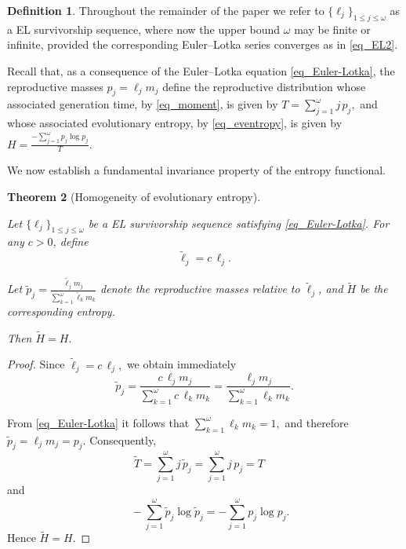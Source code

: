 \documentclass[10pt,a4paper]{amsart}
\newtheorem{thm}{Theorem}[section]
\theoremstyle{definition}
\newtheorem{defn}[thm]{Definition}
\theoremstyle{remark}
\numberwithin{equation}{section}
\begin{document}
\begin{defn}
Throughout the remainder of the paper we refer to
$
\{\ell_j\}_{1\le j\le \omega}
$
as a EL survivorship sequence, where now
the upper bound \(\omega\) may be finite or infinite, provided the
corresponding Euler--Lotka series converges as in \eqref{eq_EL2}.
\end{defn}


Recall that, as a consequence of the Euler--Lotka  equation \eqref{eq_Euler-Lotka}, the reproductive masses
$
p_j
=
\ell_jm_j
$
define the reproductive distribution whose associated
generation time, by \eqref{eq_moment}, is given by
$
T
=
\sum_{j=1}^{\omega}
j\,p_j,
$
and whose associated evolutionary entropy, by \eqref{eq_eventropy}, is given by
$H
=
\frac{
-\sum_{j=1}^{\omega}
p_j\log p_j
}
{
T
}.$

We now establish a fundamental invariance property of the entropy
functional.

\begin{thm}[Homogeneity of evolutionary entropy]
\label{thm_scale_invariance}

Let
$
\{\ell_j\}_{1\le j\le \omega}
$
be a EL survivorship sequence satisfying
\eqref{eq_Euler-Lotka}.
For any  \(c>0\), define
\[
\widetilde{\ell}_j
=
c\,\ell_j.
\]

Let 
$
\widetilde p_j
=
\frac{
	\widetilde{\ell}_j m_j
}{
	\sum_{k=1}^{\omega}
	\widetilde{\ell}_km_k
}
$
denote the reproductive masses relative to $\widetilde{\ell}_j$, and 
\(\widetilde H\) be the corresponding entropy. 
 
%
Then
$
\widetilde H
=
H.
$

\end{thm}

\begin{proof}

Since
$
\widetilde{\ell}_j
=
c\,\ell_j,
$
we obtain immediately
\[
\widetilde p_j
=
\frac{
c\,\ell_jm_j
}{
\sum_{k=1}^{\omega}
c\,\ell_km_k
}
=
\frac{
\ell_jm_j
}{
\sum_{k=1}^{\omega}
\ell_km_k
}.
\]

From \eqref{eq_Euler-Lotka} it follows that 
$
\sum_{k=1}^{\omega}
\ell_km_k
=
1,
$
and therefore
$
\widetilde p_j
=
\ell_jm_j
=
p_j.
$
Consequently,
\[ 
\widetilde T
=
\sum_{j=1}^{\omega}
j\,\widetilde p_j
=
\sum_{j=1}^{\omega}
j\,p_j
=
T
\quad\]
and
\[
\quad
-\sum_{j=1}^{\omega}
\widetilde p_j
\log\widetilde p_j
=
-\sum_{j=1}^{\omega}
p_j
\log p_j.
\]
Hence
$
\widetilde H
=
H.
$

\end{proof}
\end{document}
